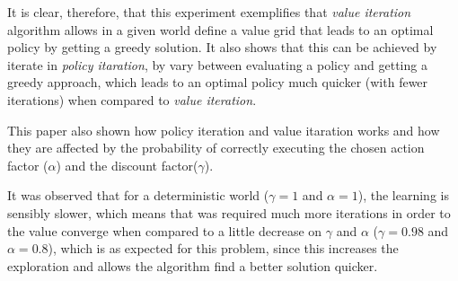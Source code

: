 \documentclass[journal,10pt,onecolumn,draftclsnofoot,]{IEEEtran}
\begin{document}
It is clear, therefore, that this experiment exemplifies that \textit{value iteration} algorithm allows in a given world define a value grid that leads to an optimal policy by getting a greedy solution. It also shows that this can be achieved by iterate in \textit{policy itaration}, by vary between evaluating a policy and getting a greedy approach, which leads to an optimal policy much quicker (with fewer iterations) when compared to \textit{value iteration}.

This paper also shown how policy iteration and value itaration works and how they are affected by the probability of correctly executing the chosen action factor ($\alpha$) and the discount factor($\gamma$).

It was observed that for a deterministic world ($\gamma = 1$ and $\alpha = 1$),
the learning is sensibly slower, which means that was required much more
iterations in order to the value converge when compared to a little decrease
on $\gamma$ and $\alpha$ ($\gamma = 0.98$ and $\alpha = 0.8$), which is as expected for this problem, since this increases the exploration and allows the algorithm find a better solution quicker.

\vfill
\end{document}
